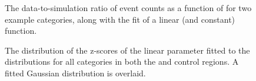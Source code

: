 \begin{figure}[!h]
\centering
{}
\caption{The data-to-simulation ratio of event counts as a function of \mht for 
two example \njnbht categories, along with the fit of a linear (and constant) 
function.}
\label{fig:mhtvalidation-fits}
\end{figure}

\begin{figure}
\centering
{}
\caption{The distribution of the z-scores of the linear parameter fitted to the 
\mht distributions for all \njnbht categories in both the \mj and \mmj control 
regions. A fitted Gaussian distribution is overlaid.}
\label{fig:mhtvalidation-pulls}
\end{figure}

